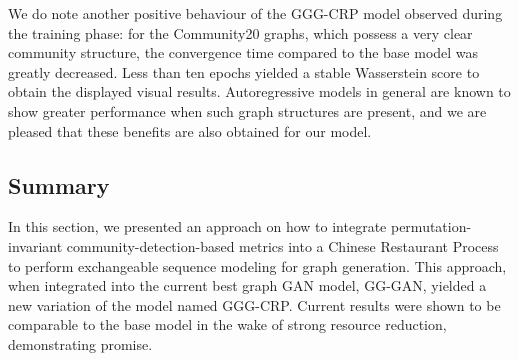 We do note another positive behaviour of the GGG-CRP model observed during the training phase: for the Community20 graphs, which possess a very clear community structure, the convergence time compared to the base model was greatly decreased. Less than ten epochs yielded a stable Wasserstein score to obtain the displayed visual results. Autoregressive models in general are known to show greater performance when such graph structures are present, and we are pleased that these benefits are also obtained for our model.


\subsection{Summary}
\label{sec:conclusion}

In this section, we presented an approach on how to integrate permutation-invariant community-detection-based metrics into a Chinese Restaurant Process to perform exchangeable sequence modeling for graph generation. This approach, when integrated into the current best graph GAN model, GG-GAN, yielded a new variation of the model named GGG-CRP. Current results were shown to be comparable to the base model in the wake of strong resource reduction, demonstrating promise. 